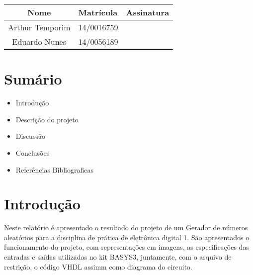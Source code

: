 \documentclass[12pts]{article}
\date{Novembro 16, 2016}
\begin{document}
\maketitle	
\begin{center}

\begin{tabular}{|c|l|r|}
\hline
Nome & Matrícula & Assinatura\\
\hline

Arthur Temporim & 14/0016759 & \\
\hline	
Eduardo Nunes & 14/0056189 & \\

\hline	
\end{tabular}

\end{center}


\newpage

\section{Sumário}

\begin{itemize}
	\item Introdução
	\singlespacing
	\item Descrição do projeto
	\singlespacing
	\item Discussão
	\singlespacing
	\item Conclusões 
	\singlespacing
	\item Referências Bibliograficas
	\singlespacing
\end{itemize}

\newpage


\section{Introdução}
\iffalse
Introdução, indicando a delimitação do tema, apresentando a justificativa descrevendo o propósito do relatório.
\fi

	Neste relatório é apresentado o resultado do projeto de um Gerador de números aleatórios para a disciplina de prática de eletrônica digital 1. São apresentados o funcionamento do projeto, com representações em imagens, as especificações das entradas e saídas utilizadas no kit BASYS3, juntamente, com o arquivo de restrição, o código VHDL assimm como diagrama do circuito. 
\end{document}

